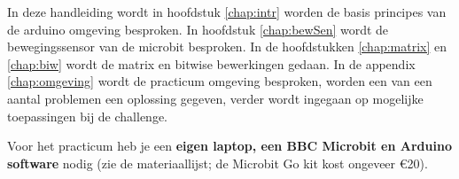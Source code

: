 In deze handleiding wordt in hoofdstuk \ref{chap:intr} worden de basis principes van de arduino omgeving besproken. In hoofdstuk \ref{chap:bewSen} wordt de bewegingssensor van de microbit besproken. In de hoofdstukken \ref{chap:matrix} en \ref{chap:biw} wordt de matrix en bitwise bewerkingen gedaan.
In de appendix \ref{chap:omgeving}  wordt de practicum omgeving besproken,  worden een van een aantal problemen een oplossing gegeven, verder wordt ingegaan op mogelijke toepassingen bij de challenge.

Voor het practicum heb je een \textbf{eigen laptop, een BBC Microbit en Arduino software} nodig 
(zie de materiaallijst; de Microbit Go kit kost ongeveer \euro{}20). 
